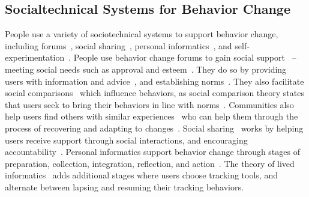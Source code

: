 \subsection{Socialtechnical Systems for Behavior Change}

People use a variety of sociotechnical systems to support behavior change, including forums~\cite{eysenbach2004health, chancellornorms}, social sharing~\cite{poirier2012social, Chung:2016:BNA:2818048.2819926, pina2017personal, Ko:2015:NGI:2675133.2675244}, personal informatics~\cite{li2010stage, Chung:2017:PTB:3025453.3025747}, and self-experimentation~\cite{Karkar:2017:TFS:3025453.3025480}. People use behavior change forums to gain social support~\cite{hong2012outcomes} -- meeting social needs such as approval and esteem~\cite{kaplan1977social}. They do so by providing users with information and advice~\cite{hong2012outcomes}, and establishing norms~\cite{chancellornorms}. They also facilitate social comparisons~\cite{davison2000talks} which influence behaviors, as social comparison theory states that users seek to bring their behaviors in line with norms~\cite{festinger1954theory}. Communities also help users find others with similar experiences~\cite{huh2014health} who can help them through the process of recovering and adapting to changes~\cite{newman2011s}. Social sharing~\cite{poirier2012social, richardson2010online} works by helping users receive support through social interactions, and encouraging accountability~\cite{epstein2015nobody}. Personal informatics support behavior change through stages of preparation, collection, integration, reflection, and action~\cite{li2010stage}. The theory of lived informatics~\cite{epstein2015lived} adds additional stages where users choose tracking tools, and alternate between lapsing and resuming their tracking behaviors. %



